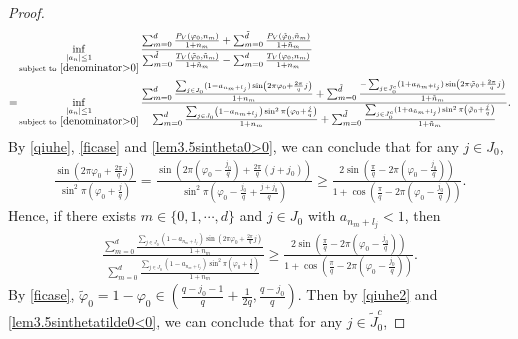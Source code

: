 \documentclass[12pt]{amsart}
\newcommand{\abs}[1]{\left\lvert #1 \right\rvert}
\theoremstyle{plain}
\theoremstyle{definition}
\begin{document}
\begin{proof}
\begin{align}
	&\inf_{\substack{\abs{a_n}\leq1\\ \text{subject to}\  \eqref{denominator>0}}}\frac{\sum_{m=0}^{d}\frac{P_V(\varphi_0,n_{m})}{1+n_{m}}+\sum_{m=0}^{\tilde{d}}\frac{P_V(\tilde{\varphi}_0,\tilde{n}_{m})}{1+\tilde{n}_{m}}}{{\sum_{m=0}^{\tilde{d}}\frac{T_V(\tilde{\varphi}_0,\tilde{n}_{m})}{1+\tilde{n}_{m}}-\sum_{m=0}^{d}\frac{T_V(\varphi_0,n_{m})}{1+n_{m}}}}\label{lem3.5inf}\\
=&\inf_{\substack{\abs{a_n}\leq1\\ \text{subject to}\  \eqref{denominator>0}}}\frac{\sum_{m=0}^{d}\frac{\sum_{j\in J_0}(1-a_{n_m+l_j})\sin\left(2\pi\varphi_0+\frac{2\pi}{q}j\right)}{1+n_{m}}+\sum_{m=0}^{\tilde{d}}\frac{-\sum_{j\in \tilde{J}_0^c}(1+a_{\tilde{n}_m+l_j})\sin\left(2\pi\tilde{\varphi}_0+\frac{2\pi}{q}j\right)}{1+\tilde{n}_{m}}}{\sum_{m=0}^d\frac{\sum_{j\in J_0}\left(1-a_{n_m+l_j}\right)\sin^2\pi\left(\varphi_0+\frac{j}{q}\right)}{1+n_m} +\sum_{m=0}^{\tilde{d}}\frac{\sum_{j\in \tilde{J}_0^c}(1+a_{\tilde{n}_m+l_j})\sin^2\pi\left(\tilde{\varphi}_0+\frac{j}{q}\right)}{1+\tilde{n}_m}}.\nonumber
\end{align}
By \eqref{qiuhe}, \eqref{ficase} and \eqref{lem3.5sintheta0>0}, we can conclude that for any $j\in J_0$,
\begin{align}
	\frac{\sin\left(2\pi\varphi_0+\frac{2\pi}{q}j\right)}{\sin^2\pi\left(\varphi_0+\frac{j}{q}\right)}=	\frac{\sin\left(2\pi\left(\varphi_0-\frac{j_0}{q}\right)+\frac{2\pi}{q}(j+j_0)\right)}{\sin^2\pi\left(\varphi_0-\frac{j_0}{q}+\frac{j+j_0}{q}\right)}\geq \frac{2\sin\left(\frac{\pi}{q}-2\pi\left(\varphi_0-\frac{j_0}{q}\right)\right)}{1+\cos\left(\frac{\pi}{q}-2\pi\left(\varphi_0-\frac{j_0}{q}\right)\right)}.\nonumber
\end{align}
Hence, if there exists $m\in \{0,1,\cdots,d\}$ and $j\in J_0$ with $a_{n_m+l_j}<1$, then
\begin{align}
	\frac{\sum_{m=0}^{d}\frac{\sum_{j\in J_0}(1-a_{n_m+l_j})\sin\left(2\pi\varphi_0+\frac{2\pi}{q}j\right)}{1+n_{m}}}{\sum_{m=0}^d\frac{\sum_{j\in J_0}\left(1-a_{n_m+l_j}\right)\sin^2\pi\left(\varphi_0+\frac{j}{q}\right)}{1+n_m} }\geq \frac{2\sin\left(\frac{\pi}{q}-2\pi\left(\varphi_0-\frac{j_0}{q}\right)\right)}{1+\cos\left(\frac{\pi}{q}-2\pi\left(\varphi_0-\frac{j_0}{q}\right)\right)}.\label{lem3.5halflarge}
\end{align}
By \eqref{ficase},  $\tilde{\varphi}_0=1-\varphi_0\in\left(\frac{q-j_0-1}{q}+\frac{1}{2q},\frac{q-j_0}{q}\right)$. Then by \eqref{qiuhe2} and \eqref{lem3.5sinthetatilde0<0}, we can conclude that for any $j\in \tilde{J}_0^c$,

\end{proof}
\end{document}

